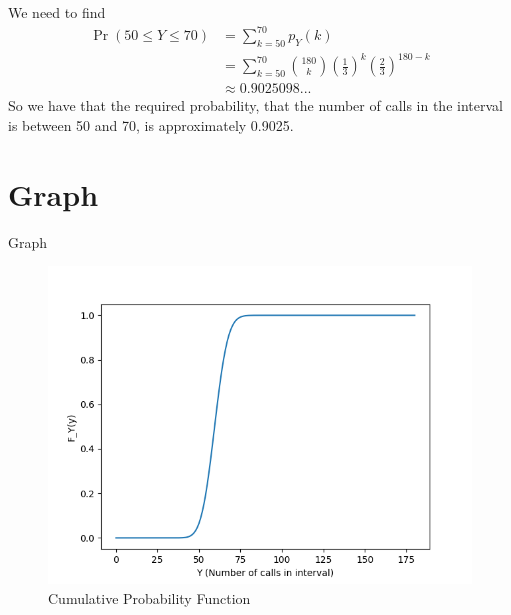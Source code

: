 \documentclass{beamer}
\providecommand{\pr}[1]{\ensuremath{\Pr\left(#1\right)}}
\begin{document}
\begin{frame}
    We need to find
    \begin{align}
        \pr{50 \leq Y \leq 70} &= \sum_{k=50}^{70} p_Y(k) \\
        &= \sum_{k=50}^{70} \binom{180}{k} \left(\frac{1}{3}\right)^{k}
            \left(\frac{2}{3}\right)^{180-k} \\
        &\approx 0.9025098...
    \end{align}
    So we have that the required probability, that the number of calls in the interval is
    between 50 and 70, is approximately 0.9025.
\end{frame}

\section{Graph}
\begin{frame}{Graph}
    \begin{figure}[!ht]
        \includegraphics[width=\textheight]{figs/cdf.png}
        \caption{Cumulative Probability Function}
        \label{figure:1}
    \end{figure}
\end{frame}
\end{document}

